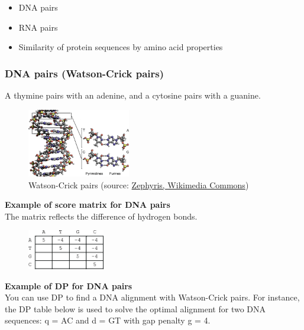 \begin{itemize}
\item DNA pairs
\item RNA pairs
\item Similarity of protein sequences by amino acid properties
\end{itemize}

%
%
\subsubsection*{DNA pairs (Watson-Crick pairs)}
A thymine pairs with an adenine, and a cytosine pairs with a guanine.

\begin{figure}[H]
  \centering
      \includegraphics[width=0.4\textwidth]{fig03/dna_watson_crick_pair.png}
  \caption{Watson-Crick pairs (source: \href{https://commons.wikimedia.org/w/index.php?curid=15027555}{Zephyris, Wikimedia Commons})}
\end{figure}

%
%
\newpage

\noindent \textbf{Example of score matrix for DNA pairs} \\
\noindent The matrix reflects the difference of hydrogen bonds.

\begin{figure}[H]
  \centering
      \includegraphics[width=0.3\textwidth]{fig03/example_dna_score_matrix.png}
\end{figure}

\noindent \textbf{Example of DP for DNA pairs} \\
\noindent You can use DP to find a DNA alignment with Watson-Crick pairs. For instance, the DP table below is used to solve the optimal alignment for two DNA sequences: q = AC and d = GT with gap penalty g = 4.

